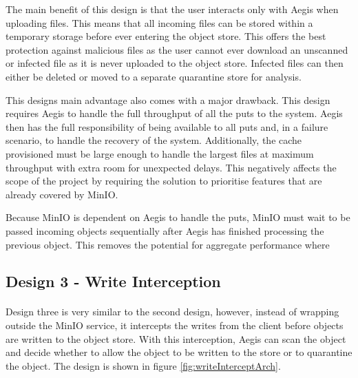 \documentclass[12pt, conference, final, a4paper, onecolumn, compsoc]{IEEEtran}
\begin{document}
The main benefit of this design is that the user interacts only with Aegis when
uploading files. This means that all incoming files can be stored within a
temporary storage before ever entering the object store. This offers the best
protection against malicious files as the user cannot ever download an unscanned
or infected file as it is never uploaded to the object store. Infected files can
then either be deleted or moved to a separate quarantine store for analysis.

This designs main advantage also comes with a major drawback. This design
requires Aegis to handle the full throughput of all the puts to the system.
Aegis then has the full responsibility of being available to all puts and, in a
failure scenario, to handle the recovery of the system. Additionally, the cache
provisioned must be large enough to handle the largest files at maximum
throughput with extra room for unexpected delays. This negatively affects the
scope of the project by requiring the solution to prioritise features that are
already covered by MinIO.


Because MinIO is dependent on Aegis to handle the puts, MinIO must wait to be
passed incoming objects sequentially after Aegis has finished processing the
previous object. This removes the potential for aggregate performance where


\subsection*{Design 3 - Write Interception}
\paragraph{}


Design three is very similar to the second design, however, instead of wrapping
outside the MinIO service, it intercepts the writes from the client before
objects are written to the object store. With this interception, Aegis can scan
the object and decide whether to allow the object to be written to the store or
to quarantine the object. The design is shown in figure
\ref{fig:writeInterceptArch}.
\end{document}
